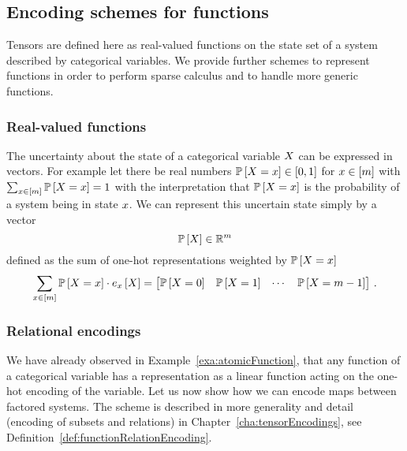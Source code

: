 \subsection{Encoding schemes for functions}

Tensors are defined here as real-valued functions on the state set of a system described by categorical variables.
We provide further schemes to represent functions in order to perform sparse calculus and to handle more generic functions.


\subsubsection{Real-valued functions}


\begin{example}\label{exa:onehotUncertainty}
	The uncertainty about the state of a categorical variable $X$ can be expressed in vectors.
	For example let there be real numbers $\mathbb{P}\left[X=x\right] \in [0,1]$ for $x\in[m]$ with $\sum_{x\in[m]}\mathbb{P}\left[X=x\right]=1$ with the interpretation that $\mathbb{P}\left[X=x\right]$ is the probability of a system being in state $x$. 
	We can represent this uncertain state simply by a vector 
		\[ \mathbb{P}\left[X\right]\in\mathbb{R}^{m} \]
	defined as the sum of one-hot representations weighted by $\mathbb{P}\left[X=x\right]$
	\[ \sum_{x\in[m]} \mathbb{P}\left[X=x\right] \cdot e_{x}\left[X\right] =
		\begin{bmatrix}
		\mathbb{P}\left[X=0\right] & \mathbb{P}\left[X=1\right] & \cdots & \mathbb{P}\left[X=m-1\right]
		\end{bmatrix} \, . 
	\]
\end{example}



\subsubsection{Relational encodings}

We have already observed in Example~\ref{exa:atomicFunction}, that any function of a categorical variable has a representation as a linear function acting on the one-hot encoding of the variable.
Let us now show how we can encode maps between factored systems.
The scheme is described in more generality and detail (encoding of subsets and relations) in Chapter~\ref{cha:tensorEncodings}, see Definition~\ref{def:functionRelationEncoding}.

